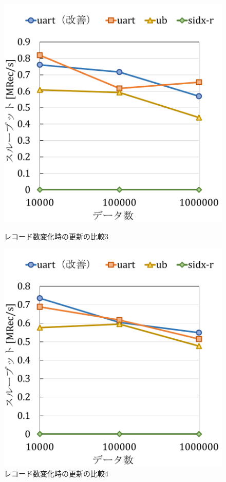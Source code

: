\begin{figure}[tb]
  \begin{minipage}[c]{0.495\textwidth}
    \centering
    \includegraphics[scale=0.5]{./figures/graph-record-update-8-0.pdf}
    \caption{レコード数変化時の更新の比較3}
    \label{graph:rec-upd-8-0}
  \end{minipage}
  \begin{minipage}[c]{0.495\textwidth}
    \centering
    \includegraphics[scale=0.5]{./figures/graph-record-update-8-0.5.pdf}
    \caption{レコード数変化時の更新の比較4}
    \label{graph:rec-upd-8-0.5}
  \end{minipage}
\end{figure}

